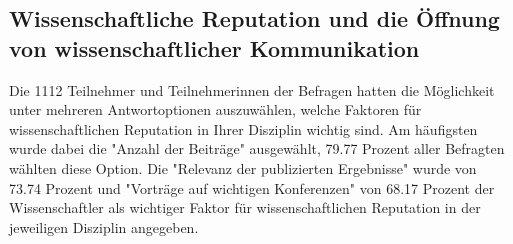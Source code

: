 \subsection{Wissenschaftliche Reputation und die Öffnung von wissenschaftlicher Kommunikation}

Die 1112 Teilnehmer und Teilnehmerinnen der Befragen hatten die Möglichkeit unter mehreren Antwortoptionen auszuwählen, welche Faktoren für wissenschaftlichen Reputation in Ihrer Disziplin wichtig sind. Am häufigsten wurde dabei die "Anzahl der Beiträge" ausgewählt, 79.77 Prozent aller Befragten wählten diese Option. Die "Relevanz der publizierten Ergebnisse" wurde von 73.74 Prozent und "Vorträge auf wichtigen Konferenzen" von 68.17 Prozent der Wissenschaftler als wichtiger Faktor für wissenschaftlichen Reputation in der jeweiligen Disziplin angegeben.

